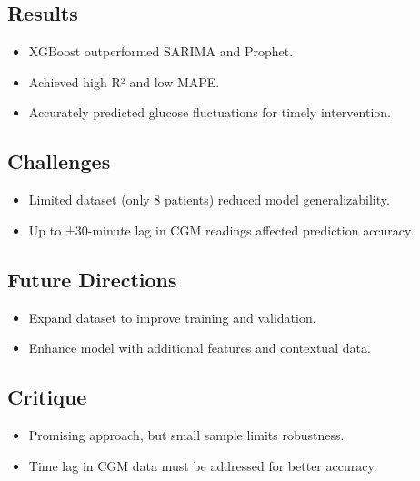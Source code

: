 \subsection*{Results}
\begin{itemize}
    \item XGBoost outperformed SARIMA and Prophet.
    \item Achieved high R² and low MAPE.
    \item Accurately predicted glucose fluctuations for timely intervention.
\end{itemize}

\subsection*{Challenges}
\begin{itemize}
    \item Limited dataset (only 8 patients) reduced model generalizability.
    \item Up to ±30-minute lag in CGM readings affected prediction accuracy.
\end{itemize}

\subsection*{Future Directions}
\begin{itemize}
    \item Expand dataset to improve training and validation.
    \item Enhance model with additional features and contextual data.
\end{itemize}

\subsection*{Critique}
\begin{itemize}
    \item Promising approach, but small sample limits robustness.
    \item Time lag in CGM data must be addressed for better accuracy.
\end{itemize}

